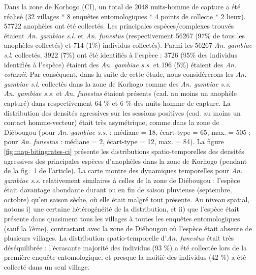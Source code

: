 \documentclass[12pt,twoside]{reedthesis}
\begin{document}
Dans la zone de Korhogo (CI), un total de 2048 nuits-homme de capture a été réalisé (32 villages * 8 enquêtes entomologiques * 4 points de collecte * 2 lieux). 57722 anophèles ont été collectés. Les principales espèces/complexes trouvés étaient \emph{An. gambiae s.l.} et \emph{An. funestus} (respectivement 56267 (97\% de tous les anophèles collectés) et 714 (1\%) individus collectés). Parmi les 56267 \emph{An. gambiae s.l.} collectés, 3922 (7\%) ont été identifiés à l'espèce : 3726 (95\% des individus identifiés à l'espèce) étaient des \emph{An. gambiae s.s.} et 196 (5\%) étaient des \emph{An. coluzzii}. Par conséquent, dans la suite de cette étude, nous considérerons les \emph{An. gambiae s.l.} collectés dans la zone de Korhogo comme des \emph{An. gambiae s.s.}\\

\emph{An. gambiae s.s.} et \emph{An. funestus} étaient présents (cad. au moins un anophèle capturé) dans respectivement 64 \% et 6 \% des nuits-homme de capture. La distribution des densités agressives sur les sessions positives (cad. au moins un contact homme-vecteur) était très asymétrique, comme dans la zone de Diébougou (pour \emph{An. gambiae s.s.} : médiane = 18, écart-type = 65, max. = 505 ; pour \emph{An. funestus} : médiane = 2, écart-type = 12, max. = 84). La figure \ref{fig:map-bitingrates-ci} présente les distributions spatio-temporelles des densités agressives des principales espèces d'anophèles dans la zone de Korhogo (pendant de la fig.~1 de l'article). La carte montre des dynamiques temporelles pour \emph{An. gambiae s.s.} relativement similaires à celles de la zone de Diébougou : l'espèce était davantage abondante durant ou en fin de saison pluvieuse (septembre, octobre) qu'en saison sèche, où elle était malgré tout présente. Au niveau spatial, notons i) une certaine hétérogénéité de la distribution, et ii) que l'espèce était présente dans quasiment tous les villages à toutes les enquêtes entomologiques (sauf la 7ème), contrastant avec la zone de Diébougou où l'espèce était absente de plusieurs villages. La distribution spatio-temporelle d'\emph{An. funestus} était très déséquilibrée : l'écrasante majorité des individus (93 \%) a été collectée lors de la première enquête entomologique, et presque la moitié des individus (42 \%) a été collecté dans un seul village.\\
\end{document}
